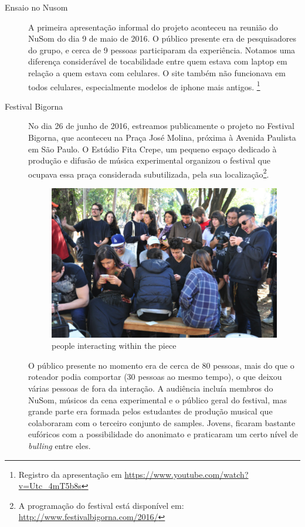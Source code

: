 \begin{description}

\item[Ensaio no Nusom] 
A primeira apresentação informal do projeto aconteceu na reunião do NuSom do dia 9 de maio de 2016. O público presente era de pesquisadores do grupo, e cerca de 9 pessoas participaram da experiência. Notamos uma diferença considerável de tocabilidade entre quem estava com laptop em relação a quem estava com celulares. O site também não funcionava em todos celulares, especialmente modelos de iphone mais antigos. \footnote{Registro da apresentação em \url{https://www.youtube.com/watch?v=Utc_4mT5b8s}}

\item[Festival Bigorna]
No dia 26 de junho de 2016, estreamos publicamente o projeto no Festival Bigorna, que aconteceu na Praça José Molina, próxima à Avenida Paulista em São Paulo. O Estúdio Fita Crepe, um pequeno espaço dedicado à produção e difusão de música experimental organizou o festival que ocupava essa praça considerada subutilizada, pela sua localização\footnote{A programação do festival está disponível em: \url{http://www.festivalbigorna.com/2016/}}.

\begin{figure}[!ht]
    \centering
        \includegraphics[width=1\textwidth]{pictures/bigorna}
        \vspace{-10pt}
    \caption{people interacting within the piece}
    \label{fig:performer}
\end{figure}

O público presente no momento era de cerca de 80 pessoas, mais do que o roteador podia comportar (30 pessoas ao mesmo tempo), o que deixou várias pessoas de fora da interação. A audiência incluía membros do NuSom, músicos da cena experimental e o público geral do festival, mas grande parte era formada pelos estudantes de produção musical que colaboraram com o terceiro conjunto de samples. Jovens, ficaram bastante eufóricos com a possibilidade do anonimato e praticaram um certo nível de \emph{bulling} entre eles. 


\end{description}
